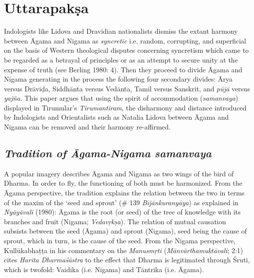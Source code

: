 \section*{Uttarapakṣa}

\vskip -6pt

Indologists like Lidova and Dravidian nationalists dismiss the extant harmony between Āgama and Nigama as \textit{syncretic} i.e. random, corrupting, and superficial on the basis of Western theological disputes concerning syncretism which came to be regarded as a betrayal of principles or as an attempt to secure unity at the expense of truth (see Berling 1980: 4). Then they proceed to divide Āgama and Nigama generating in the process the following four secondary divides: Ārya versus Drāviḍa, Siddhānta versus Vedānta, Tamil versus Sanskrit, and \textit{pūjā} versus \textit{yajña.} This paper argues that using the spirit of accommodation (\textit{samanvaya}) displayed in Tirumular’s \textit{Tirumantiram}, the disharmony and distance introduced by Indologists and Orientalists such as Natalia Lidova between Āgama and Nigama can be removed and their harmony re-affirmed.

\subsection*{\textit{Tradition of Āgama-Nigama samanvaya}}

\vskip -6pt

A popular imagery describes Āgama and Nigama as two wings of the bird of Dharma. In order to fly, the functioning of both must be harmonized. From the Āgama perspective, the tradition explains the relation between the two in terms of the maxim of the ‘seed and sprout’ (\# 139 \textit{Bījānkuranyāya}) as explained in \textit{Nyāyāvali} (1980): Āgama is the root (or seed) of the tree of knowledge with its branches and fruit (Nigama; \textit{Vedavṛkṣa}). The relation of mutual causation subsists between the seed (Āgama) and sprout (Nigama), seed being the cause of sprout, which in turn, is the cause of the seed. From the Nigama perspective, Kullūkabhaṭṭa in his commentary on the \textit{Manusmṛti} (\textit{Mānvārthamuktāvali}; 2:1) cites \textit{Harita Dharmaśāstra} to the effect that Dharma is legitimated through Śruti, which is twofold: Vaidika (i.e. Nigama) and Tāntrika (i.e. Āgama).


